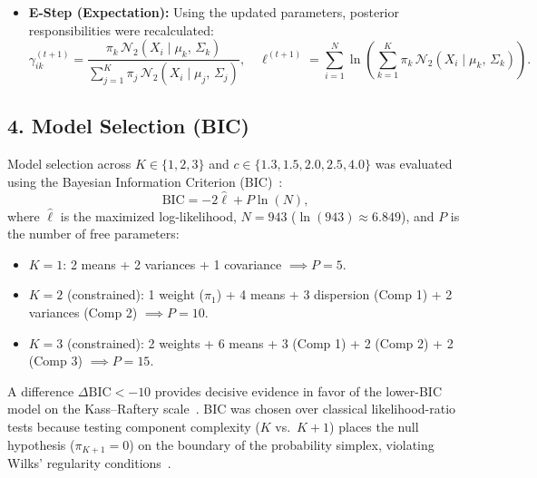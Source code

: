 \documentclass[11pt,a4paper]{article}
\begin{document}
\begin{itemize}[noitemsep,topsep=2pt]
\begin{itemize}[noitemsep,topsep=1pt]
    \end{itemize}
    \item \textbf{E-Step (Expectation):} Using the updated parameters, posterior responsibilities were recalculated:
    \begin{equation}
    \gamma_{ik}^{(t+1)} = \frac{\pi_k \, \mathcal{N}_2\left(X_i \mid \mu_k, \, \Sigma_k\right)}{\sum_{j=1}^K \pi_j \, \mathcal{N}_2\left(X_i \mid \mu_j, \, \Sigma_j\right)}, \quad \ell^{(t+1)} = \sum_{i=1}^N \ln \left( \sum_{k=1}^K \pi_k \, \mathcal{N}_2\left(X_i \mid \mu_k, \, \Sigma_k\right) \right).
    \end{equation}
\end{itemize}

\subsection*{4. Model Selection (BIC)}
Model selection across $K \in \{1, 2, 3\}$ and $c \in \{1.3, 1.5, 2.0, 2.5, 4.0\}$ was evaluated using the Bayesian Information Criterion (BIC)~\cite{schwarz1978estimating}:
\begin{equation}
\text{BIC} = -2\hat{\ell} + P \ln(N),
\end{equation}
where $\hat{\ell}$ is the maximized log-likelihood, $N = 943$ ($\ln(943) \approx 6.849$), and $P$ is the number of free parameters:
\begin{itemize}[noitemsep,topsep=2pt]
    \item $K = 1$: 2 means + 2 variances + 1 covariance $\implies P = 5$.
    \item $K = 2$ (constrained): 1 weight ($\pi_1$) + 4 means + 3 dispersion (Comp 1) + 2 variances (Comp 2) $\implies P = 10$.
    \item $K = 3$ (constrained): 2 weights + 6 means + 3 (Comp 1) + 2 (Comp 2) + 2 (Comp 3) $\implies P = 15$.
\end{itemize}
A difference $\Delta\text{BIC} < -10$ provides decisive evidence in favor of the lower-BIC model on the Kass--Raftery scale~\cite{kass1995bayes}. BIC was chosen over classical likelihood-ratio tests because testing component complexity ($K$ vs.\ $K+1$) places the null hypothesis ($\pi_{K+1} = 0$) on the boundary of the probability simplex, violating Wilks' regularity conditions~\cite{mclachlan2000finite}.
\end{document}
